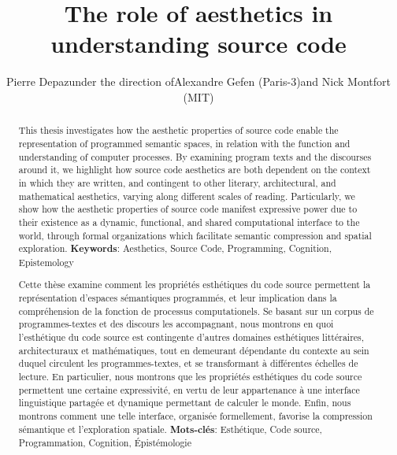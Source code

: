\documentclass{report}
\begin{document}
\title{The role of aesthetics   in understanding source code}
\author{Pierre Depaz\linebreak\linebreak under the direction of\linebreak Alexandre Gefen (Paris-3)\linebreak and Nick Montfort (MIT)}
\date{}
\maketitle

\renewcommand{\abstractname}{Summary}
\begin{abstract}
    This thesis investigates how the aesthetic properties of source code enable the representation of programmed semantic spaces, in relation with the function and understanding of computer processes. By examining program texts and the discourses around it, we highlight how source code aesthetics are both dependent on the context in which they are written, and contingent to other literary, architectural, and mathematical aesthetics, varying along different scales of reading. Particularly, we show how the aesthetic properties of source code manifest expressive power due to their existence as a dynamic, functional, and shared computational interface to the world, through formal organizations which facilitate semantic compression and spatial exploration.
    \linebreak
    \linebreak
    \textbf{Keywords}: Aesthetics, Source Code, Programming, Cognition, Epistemology
\end{abstract}

\renewcommand{\abstractname}{Résumé}
\begin{abstract}
    Cette thèse examine comment les propriétés esthétiques du code source permettent la représentation d'espaces sémantiques programmés, et leur implication dans la compréhension de la fonction de processus computationels. Se basant sur un corpus de programmes-textes et des discours les accompagnant, nous montrons en quoi l'esthétique du code source est contingente d'autres domaines esthétiques littéraires, architecturaux et mathématiques, tout en demeurant dépendante du contexte au sein duquel circulent les programmes-textes, et se transformant à différentes échelles de lecture. En particulier, nous montrons que les propriétés esthétiques du code source permettent une certaine expressivité, en vertu de leur appartenance à une interface linguistique partagée et dynamique permettant de calculer le monde. Enfin, nous montrons comment une telle interface, organisée formellement, favorise la compression sémantique et l'exploration spatiale.
    \linebreak
    \linebreak
    \textbf{Mots-clés}: Esthétique, Code source, Programmation, Cognition, Épistémologie
\end{abstract}
\end{document}
